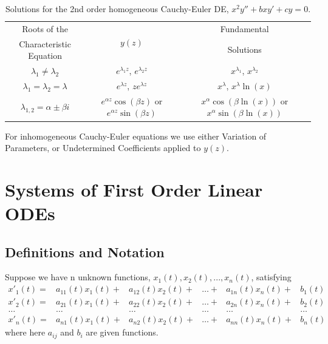 \documentclass[12pt, a4paper, oneside, openright, titlepage]{book}
\begin{document}


\bgroup
\def\arraystretch{1.5}
\begin{table}[H]
        \centering
        \caption{Solutions for the 2nd order homogeneous Cauchy-Euler DE, $x^2y''+bxy'+cy=0$.}
        \begin{tabular}{c|c|c}
                Roots of the & \multirow{2}{*}{$y(z)$} & Fundamental \\
                Characteristic Equation &  & Solutions \\ \hline
                $\lambda_1 \neq \lambda_2$ & $e^{\lambda_1 z}$, $e^{\lambda_2 z}$ & $x^{\lambda_1}$, $x^{\lambda_2}$ \\
                $\lambda_1=\lambda_2=\lambda$ & $e^{\lambda z}$, $ze^{\lambda z}$ & $x^{\lambda}$, $x^{\lambda}\ln(x)$ \\
                $\lambda_{1,2} = \alpha \pm \beta i$ & $e^{\alpha z}\cos(\beta z)$ or $e^{\alpha z}\sin(\beta z)$ & $x^{\alpha}\cos(\beta\ln(x))$ or $x^{\alpha}\sin(\beta\ln(x))$ \\
        \end{tabular}
\end{table}
\egroup


\begin{rmk}
        For inhomogeneous Cauchy-Euler equations we use either Variation of Parameters, or Undetermined Coefficients applied to $y(z)$.
\end{rmk}



\clearpage

\chapter{Systems of First Order Linear ODEs}


\section{Definitions and Notation}

\begin{defn}
        Suppose we have n unknown functions, $x_1(t),x_2(t),...,x_n(t)$, satisfying \begin{equation}
                \begin{matrix}
                        x'_1(t)=&a_{11}(t)x_1(t)+&a_{12}(t)x_2(t)+&\hdots+&a_{1n}(t)x_n(t)+&b_1(t) \\
                        x'_2(t)=&a_{21}(t)x_1(t)+&a_{22}(t)x_2(t)+&\hdots+&a_{2n}(t)x_n(t)+&b_2(t) \\
                        \hdots&\hdots&\hdots&\hdots&\hdots&\hdots \\
                        x'_n(t)=&a_{n1}(t)x_1(t)+&a_{n2}(t)x_2(t)+&\hdots+&a_{nn}(t)x_n(t)+&b_n(t) 
                \end{matrix}
        \end{equation}
        where here $a_{ij}$ and $b_{i}$ are given functions.
\end{defn}
\end{document}
